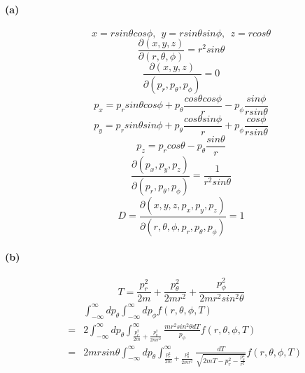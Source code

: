 \documentclass{article}
\begin{document}
\paragraph{(a)}
\[x=r sin\theta cos\phi, \ \ y=r sin\theta sin\phi, \ \ z=r cos\theta\]
\[\frac{\partial(x,y,z)}{\partial(r,\theta,\phi)}=r^2 sin\theta \]
\[\frac{\partial(x,y,z)}{\partial(p_r,p_{\theta},p_{\phi})}=0 \]
\[p_x=p_r sin\theta cos\phi + p_{\theta} \frac{cos\theta cos\phi}{r}-p_{\phi}\frac{sin\phi}{r sin\theta}\]
\[p_y=p_r sin\theta sin\phi + p_{\theta} \frac{cos\theta sin\phi}{r}+p_{\phi}\frac{cos\phi}{r sin\theta}\]
\[p_z=p_r cos\theta - p_{\theta} \frac{sin\theta}{r}\]
\[\frac{\partial(p_x,p_y,p_z)}{\partial(p_r,p_{\theta},p_{\phi})}=\frac{1}{r^2 sin\theta} \]
\[D=\frac{\partial(x,y,z,p_x,p_y,p_z)}{\partial(r,\theta,\phi,p_r,p_{\theta},p_{\phi})}=1 \]
\paragraph{(b)}
\[T=\frac{p_r^2}{2m}+\frac{p_{\theta}^2}{2mr^2}+\frac{p_{\phi}^2}{2mr^2 sin^2\theta}\]
\begin{eqnarray*}
&\ &\int_{-\infty}^{\infty} dp_{\theta} \int_{-\infty}^{\infty} dp_{\phi} f(r,\theta,\phi,T)\\
&=&2\int_{-\infty}^{\infty} dp_{\theta} \int_{\frac{p_r^2}{2m}+\frac{p_{\theta}^2}{2mr^2}}^{\infty} 
\frac{mr^2 sin^2\theta dT}{p_{\phi}} f(r,\theta,\phi,T) \\
&=&2mrsin\theta\int_{-\infty}^{\infty} dp_{\theta} \int_{\frac{p_r^2}{2m}+\frac{p_{\theta}^2}{2mr^2}}^{\infty} \frac{dT}{\sqrt{2mT-p_r^2-\frac{p_{\theta}^2}{r^2}}}f(r,\theta,\phi,T)
\end{eqnarray*}
\end{document}
